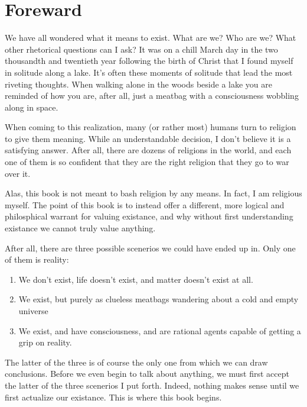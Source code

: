 \chapter{Foreward}

We have all wondered what it means to exist. What are we? Who are we? What other rhetorical questions
can I ask? It was on a chill March day in the two thousandth and twentieth year following the birth of Christ
that I found myself in solitude along a lake. It's often these moments of solitude that lead the most riveting
thoughts. When walking alone in the woods beside a lake you are reminded of how you are, after all, just a 
meatbag with a consciousness wobbling along in space.

When coming to this realization, many (or rather most) humans turn to religion to give them meaning. While
an understandable decision, I don't believe it is a satisfying answer. After all, there are dozens of religions
in the world, and each one of them is so confident that they are the right religion that they go to war over
it.

Alas, this book is not meant to bash religion by any means. In fact, I am religious myself. The point of
this book is to instead offer a different, more logical and philosphical warrant for valuing existance, and
why without first understanding existance we cannot truly value anything.

After all, there are three possible scenerios we could have ended up in. Only one of them is reality:

\begin{enumerate}
    \item We don't exist, life doesn't exist, and matter doesn't exist at all.
    \item We exist, but purely as clueless meatbags wandering about a cold and empty universe
    \item We exist, and have consciousness, and are rational agents capable of getting a grip on reality.
\end{enumerate}

The latter of the three is of course the only one from which we can draw conclusions. Before we even begin
to talk about anything, we must first accept the latter of the three scenerios I put forth. Indeed, nothing
makes sense until we first actualize our existance. This is where this book begins.
